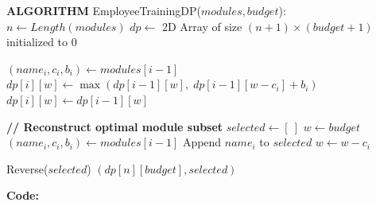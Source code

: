 \documentclass[12pt]{article}
\begin{document}
\vspace{0.2cm}

\begin{algorithm}[H]
\caption{EmployeeTrainingDP}
\begin{algorithmic}[1]
\State \textbf{ALGORITHM} EmployeeTrainingDP($modules, budget$):
    \State $n \gets Length(modules)$
    \State $dp \gets$ 2D Array of size $(n + 1) \times (budget + 1)$ initialized to $0$

        \State $(name_i, c_i, b_i) \gets modules[i - 1]$
                \State $dp[i][w] \gets \max(dp[i - 1][w], \; dp[i - 1][w - c_i] + b_i)$
            \Else
                \State $dp[i][w] \gets dp[i - 1][w]$
            \EndIf
        \EndFor
    \EndFor

    \State \textbf{// Reconstruct optimal module subset}
    \State $selected \gets [\ ]$
    \State $w \gets budget$
            \State $(name_i, c_i, b_i) \gets modules[i - 1]$
            \State Append $name_i$ to $selected$
            \State $w \gets w - c_i$
        \EndIf
    \EndFor

    \State Reverse($selected$)
    \State \Return $(dp[n][budget], selected)$
\end{algorithmic}
\end{algorithm}

\newpage
\textbf{Code:}
\end{document}
